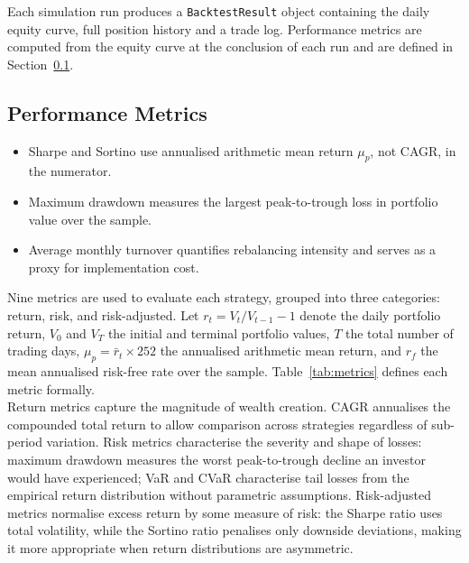 \documentclass[a4paper,alpha-refs]{scr-contemporary}
\numberwithin{equation}{section}
\begin{document}
\indent Each simulation run produces a \texttt{BacktestResult} object containing the daily 
equity curve, full position history and a trade log. Performance metrics are computed 
from the equity curve at the conclusion of each run and are defined in 
Section~\ref{sec:performance-metrics}.

\subsection{Performance Metrics}
\label{sec:performance-metrics}

\begin{keypoints*}
\begin{itemize}
  \item Sharpe and Sortino use annualised arithmetic mean return $\mu_p$, not CAGR, in the numerator.
  \item Maximum drawdown measures the largest peak-to-trough loss in portfolio value over the sample.
  \item Average monthly turnover quantifies rebalancing intensity and serves as a proxy for implementation cost.
\end{itemize}
\end{keypoints*}

\indent \indent Nine metrics are used to evaluate each strategy, grouped
into three categories: return, risk, and risk-adjusted. Let
$r_t = V_t / V_{t-1} - 1$ denote the daily portfolio return,
$V_0$ and $V_T$ the initial and terminal portfolio values, $T$ the total
number of trading days, $\mu_p = \bar{r}_t \times 252$ the annualised
arithmetic mean return, and $r_f$ the mean annualised risk-free rate over
the sample. Table~\ref{tab:metrics} defines each metric formally. \\

\indent Return metrics capture the magnitude of wealth creation. 
CAGR annualises the compounded total return to allow comparison across 
strategies regardless of sub-period variation. \newline 
\indent Risk metrics characterise the severity and shape of losses: 
maximum drawdown measures the worst peak-to-trough decline an investor 
would have experienced; VaR and CVaR characterise tail losses from the 
empirical return distribution without parametric assumptions. \newline 
\indent Risk-adjusted metrics normalise excess return by some measure of 
risk: the Sharpe ratio uses total volatility, while the Sortino ratio 
penalises only downside deviations, making it more appropriate when
return distributions are asymmetric.
\end{document}
